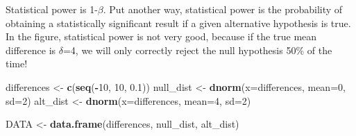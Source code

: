 \documentclass[
]{article}
\newenvironment{Shaded}{\begin{snugshade}}{\end{snugshade}}
\newcommand{\AttributeTok}[1]{\textcolor[rgb]{0.13,0.29,0.53}{#1}}
\newcommand{\DecValTok}[1]{\textcolor[rgb]{0.00,0.00,0.81}{#1}}
\newcommand{\FloatTok}[1]{\textcolor[rgb]{0.00,0.00,0.81}{#1}}
\newcommand{\FunctionTok}[1]{\textcolor[rgb]{0.13,0.29,0.53}{\textbf{#1}}}
\newcommand{\NormalTok}[1]{#1}
\newcommand{\OtherTok}[1]{\textcolor[rgb]{0.56,0.35,0.01}{#1}}
\newcommand{\SpecialCharTok}[1]{\textcolor[rgb]{0.81,0.36,0.00}{\textbf{#1}}}
\begin{document}
Statistical power is 1-\(\beta\). Put another way, statistical power is
the probability of obtaining a statistically significant result if a
given alternative hypothesis is true. In the figure, statistical power
is not very good, because if the true mean difference is \(\delta\)=4,
we will only correctly reject the null hypothesis 50\% of the time!

\begin{Shaded}
\begin{Highlighting}[]
\NormalTok{differences }\OtherTok{\textless{}{-}} \FunctionTok{c}\NormalTok{(}\FunctionTok{seq}\NormalTok{(}\SpecialCharTok{{-}}\DecValTok{10}\NormalTok{, }\DecValTok{10}\NormalTok{, }\FloatTok{0.1}\NormalTok{))}
\NormalTok{null\_dist }\OtherTok{\textless{}{-}} \FunctionTok{dnorm}\NormalTok{(}\AttributeTok{x=}\NormalTok{differences, }\AttributeTok{mean=}\DecValTok{0}\NormalTok{, }\AttributeTok{sd=}\DecValTok{2}\NormalTok{)}
\NormalTok{alt\_dist }\OtherTok{\textless{}{-}} \FunctionTok{dnorm}\NormalTok{(}\AttributeTok{x=}\NormalTok{differences, }\AttributeTok{mean=}\DecValTok{4}\NormalTok{, }\AttributeTok{sd=}\DecValTok{2}\NormalTok{)}

\NormalTok{DATA }\OtherTok{\textless{}{-}} \FunctionTok{data.frame}\NormalTok{(differences, null\_dist, alt\_dist)}
\end{Highlighting}
\end{Shaded}
\end{document}
